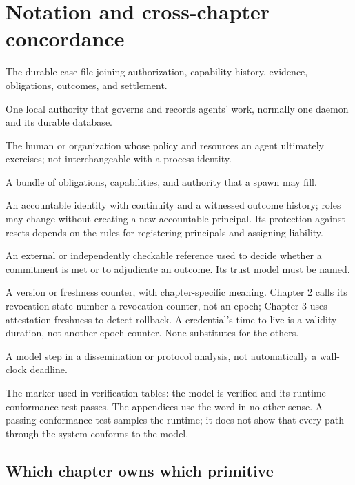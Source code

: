 \section{Notation and cross-chapter concordance}\label{app:concordance}
\begin{description}[leftmargin=1.4em,itemsep=4pt]
  \item[Work unit] The durable case file joining authorization, capability
  history, evidence, obligations, outcomes, and settlement.
  \item[Harbor] One local authority that governs and records agents' work,
  normally one daemon and its durable database.
  \item[Principal] The human or organization whose policy and resources an
  agent ultimately exercises; not interchangeable with a process identity.
  \item[Role] A bundle of obligations, capabilities, and authority that a spawn
  may fill.
  \item[Person] An accountable identity with continuity and a witnessed outcome history;
  roles may change without creating a new accountable principal. Its
  protection against resets depends on the rules for registering principals
  and assigning liability.
  \item[Oracle] An external or independently checkable reference used to decide
  whether a commitment is met or to adjudicate an outcome. Its trust model must
  be named.
  \item[Epoch] A version or freshness counter, with chapter-specific meaning.
  Chapter 2 calls its revocation-state number a revocation counter, not an
  epoch; Chapter 3 uses attestation freshness to
  detect rollback. A credential's time-to-live is a validity duration, not
  another epoch counter. None substitutes for the others.
  \item[Round] A model step in a dissemination or protocol analysis, not
  automatically a wall-clock deadline.
  \item[Closed] The marker used in verification tables: the model is verified
  and its runtime conformance test passes. The appendices use the word in no
  other sense. A passing conformance test samples the runtime; it does not show
  that every path through the system conforms to the model.
\end{description}

\subsection*{Which chapter owns which primitive}
\label{app:ownership}

